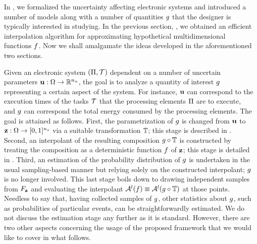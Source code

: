 In , we formalized the uncertainty affecting electronic systems
and introduced a number of models along with a number of quantities $g$ that
the designer is typically interested in studying. In the previous section,
, we obtained an efficient interpolation algorithm for
approximating hypothetical multidimensional functions $f$. Now we shall
amalgamate the ideas developed in the aforementioned two sections.

Given an electronic system $(\Pi, \mathcal{T})$ dependent on a number of uncertain
parameters $\mathbf{u}: \Omega \to \mathbb{R}^{n_u}$, the goal is to analyze a quantity of
interest $g$ representing a certain aspect of the system. For instance, $\mathbf{u}$
can correspond to the execution times of the tasks $\mathcal{T}$ that the processing
elements $\Pi$ are to execute, and $g$ can correspond the total energy
consumed by the processing elements. The goal is attained as follows. First, the
parametrization of $g$ is changed from $\mathbf{u}$ to \rvs\ $\mathbf{z}: \Omega \to [0,
1]^{n_z}$ via a suitable transformation $\mathbb{T}$; this stage is described
in . Second, an interpolant of the resulting
composition $g \circ \mathbb{T}$ is constructed by treating the
composition as a deterministic function $f$ of $\mathbf{z}$; this stage is detailed in
. Third, an estimation of the probability distribution of
$g$ is undertaken in the usual sampling-based manner but relying solely on the
constructed interpolant; $g$ is no longer involved. This last stage boils down
to drawing independent samples from $F_{\mathbf{z}}$ and evaluating the
interpolant $\mathcal{A}^{l}(f) \equiv \mathcal{A}^{l}(g \circ \mathbb{T})$ at
those points. Needless to say that, having collected samples of $g$, other
statistics about $g$, such as probabilities of particular events, can be
straightforwardly estimated. We do not discuss the estimation stage any further
as it is standard. However, there are two other aspects concerning the usage of
the proposed framework that we would like to cover in what follows.

